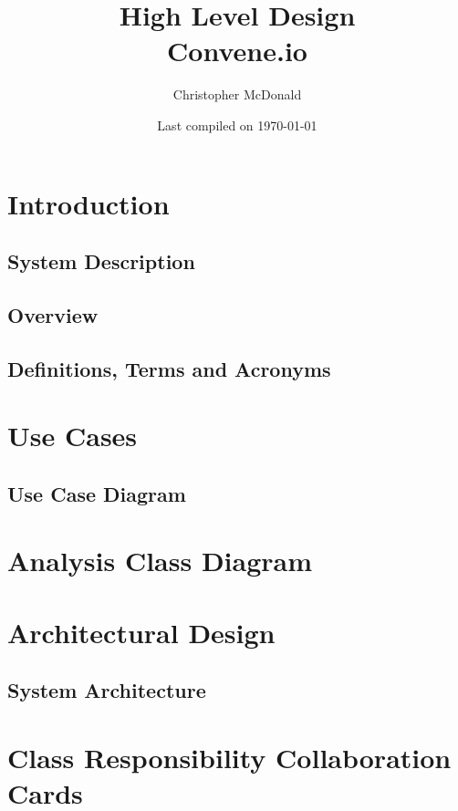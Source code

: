 \documentclass[11pt, oneside]{article}
\title{ High Level Design \\ Convene.io}
\author{Christopher McDonald}
\date{Last compiled on \today}
\begin{document}
\maketitle
\tableofcontents
\section{Introduction}
\subsection{System Description}
\subsection{Overview}
\subsection{Definitions, Terms and Acronyms}

\section{Use Cases}
\subsection{Use Case Diagram}

\section{Analysis Class Diagram}

\section{Architectural Design}
\subsection{System Architecture}

\section{Class Responsibility Collaboration Cards}
\end{document}

